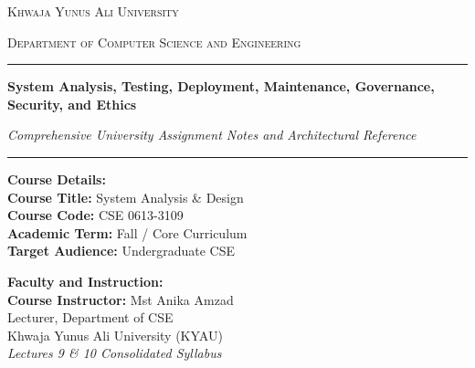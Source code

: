 \documentclass[11pt,a4paper]{article}
\begin{document}
\hypersetup{pageanchor=false}

\begin{titlepage}
    \centering
    \vspace*{0.5cm}
    
    {\scshape\LARGE Khwaja Yunus Ali University \par}
    \vspace{0.3cm}
    {\scshape\large Department of Computer Science and Engineering \par}
    \vspace{1.2cm}
    
    \rule{\textwidth}{1.5pt}\par
    \vspace{0.4cm}
    {\Huge\bfseries\color{primaryNavy} System Analysis, Testing, Deployment, Maintenance, Governance, Security, and Ethics \par}
    \vspace{0.4cm}
    {\large\itshape Comprehensive University Assignment Notes and Architectural Reference \par}
    \vspace{0.4cm}
    \rule{\textwidth}{1.5pt}\par
    
    \vspace{1.5cm}
    
    \begin{minipage}[t]{0.48\textwidth}
        \textbf{Course Details:}\\
        \textbf{Course Title:} System Analysis \& Design\\
        \textbf{Course Code:} CSE 0613-3109\\
        \textbf{Academic Term:} Fall / Core Curriculum\\
        \textbf{Target Audience:} Undergraduate CSE
    \end{minipage}
    \hfill
    \begin{minipage}[t]{0.48\textwidth}
        \raggedleft
        \textbf{Faculty and Instruction:}\\
        \textbf{Course Instructor:} Mst Anika Amzad\\
        Lecturer, Department of CSE\\
        Khwaja Yunus Ali University (KYAU)\\
        \textit{Lectures 9 \& 10 Consolidated Syllabus}
    \end{minipage}
    

\end{titlepage}
\end{document}

